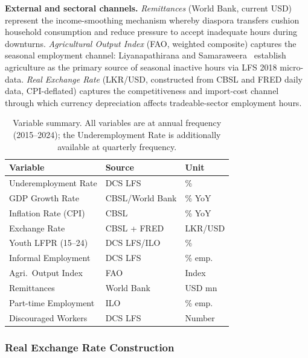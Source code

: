 \documentclass[sigconf]{acmart}
\begin{document}
\textbf{External and sectoral channels.} \emph{Remittances} (World
Bank, current USD) represent the income-smoothing mechanism
whereby diaspora transfers cushion household consumption and reduce
pressure to accept inadequate hours during downturns. \emph{Agricultural
Output Index} (FAO, weighted composite) captures the seasonal
employment channel: Liyanapathirana and Samaraweera~\cite{perera2022} establish agriculture
as the primary source of seasonal inactive hours via LFS 2018
micro-data. \emph{Real Exchange Rate} (LKR/USD, constructed from CBSL
and FRED daily data, CPI-deflated) captures the competitiveness and
import-cost channel through which currency depreciation affects
tradeable-sector employment hours.

\begin{table}[h]
\caption{Variable summary. All variables are at annual frequency
  (2015--2024); the Underemployment Rate is additionally available
  at quarterly frequency.}
\label{tab:variables}
\setlength{\tabcolsep}{3.5pt}
\footnotesize
\begin{tabular}{lll}
\toprule
\textbf{Variable} & \textbf{Source} & \textbf{Unit}\\
\midrule
Underemployment Rate    & DCS LFS         & \%       \\
GDP Growth Rate         & CBSL/World Bank & \% YoY   \\
Inflation Rate (CPI)    & CBSL            & \% YoY   \\
Exchange Rate           & CBSL + FRED     & LKR/USD  \\
Youth LFPR (15--24)     & DCS LFS/ILO     & \%       \\
Informal Employment     & DCS LFS         & \% emp.  \\
Agri.\ Output Index     & FAO             & Index    \\
Remittances             & World Bank      & USD mn   \\
Part-time Employment    & ILO             & \% emp.  \\
Discouraged Workers     & DCS LFS         & Number   \\
\bottomrule
\end{tabular}
\end{table}

\subsubsection{Real Exchange Rate Construction}
\end{document}
